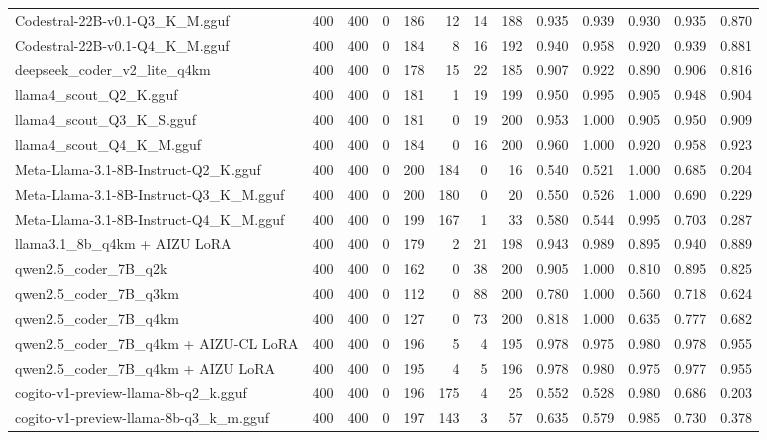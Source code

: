 \begin{table}[htbp]
{\begin{tabular}{lrrrrrrrrrrrr}
    Codestral-22B-v0.1-Q3\_K\_M.gguf & 400 & 400 & 0 & 186 & 12 & 14 & 188 & 0.935 & 0.939 & 0.930 & 0.935 & 0.870 \\
    Codestral-22B-v0.1-Q4\_K\_M.gguf & 400 & 400 & 0 & 184 & 8 & 16 & 192 & 0.940 & 0.958 & 0.920 & 0.939 & 0.881 \\
    deepseek\_coder\_v2\_lite\_q4km & 400 & 400 & 0 & 178 & 15 & 22 & 185 & 0.907 & 0.922 & 0.890 & 0.906 & 0.816 \\
    llama4\_scout\_Q2\_K.gguf & 400 & 400 & 0 & 181 & 1 & 19 & 199 & 0.950 & 0.995 & 0.905 & 0.948 & 0.904 \\
    llama4\_scout\_Q3\_K\_S.gguf & 400 & 400 & 0 & 181 & 0 & 19 & 200 & 0.953 & 1.000 & 0.905 & 0.950 & \cellcolor{green!10}0.909 \\
    llama4\_scout\_Q4\_K\_M.gguf & 400 & 400 & 0 & 184 & 0 & 16 & 200 & 0.960 & 1.000 & 0.920 & 0.958 & \cellcolor{green!30}0.923 \\
    Meta-Llama-3.1-8B-Instruct-Q2\_K.gguf & 400 & 400 & 0 & 200 & 184 & 0 & 16 & 0.540 & 0.521 & 1.000 & 0.685 & 0.204 \\
    Meta-Llama-3.1-8B-Instruct-Q3\_K\_M.gguf & 400 & 400 & 0 & 200 & 180 & 0 & 20 & 0.550 & 0.526 & 1.000 & 0.690 & 0.229 \\
    Meta-Llama-3.1-8B-Instruct-Q4\_K\_M.gguf & 400 & 400 & 0 & 199 & 167 & 1 & 33 & 0.580 & 0.544 & 0.995 & 0.703 & 0.287 \\
    llama3.1\_8b\_q4km + AIZU LoRA & 400 & 400 & 0 & 179 & 2 & 21 & 198 & 0.943 & 0.989 & 0.895 & 0.940 & 0.889 \\
    qwen2.5\_coder\_7B\_q2k & 400 & 400 & 0 & 162 & 0 & 38 & 200 & 0.905 & 1.000 & 0.810 & 0.895 & 0.825 \\
    qwen2.5\_coder\_7B\_q3km & 400 & 400 & 0 & 112 & 0 & 88 & 200 & 0.780 & 1.000 & 0.560 & 0.718 & 0.624 \\
    qwen2.5\_coder\_7B\_q4km & 400 & 400 & 0 & 127 & 0 & 73 & 200 & 0.818 & 1.000 & 0.635 & 0.777 & 0.682 \\
    qwen2.5\_coder\_7B\_q4km + AIZU-CL LoRA & 400 & 400 & 0 & 196 & 5 & 4 & 195 & 0.978 & 0.975 & 0.980 & 0.978 & \cellcolor{green!50}0.955 \\
    qwen2.5\_coder\_7B\_q4km + AIZU LoRA & 400 & 400 & 0 & 195 & 4 & 5 & 196 & 0.978 & 0.980 & 0.975 & 0.977 & \cellcolor{green!40}0.955 \\
    cogito-v1-preview-llama-8b-q2\_k.gguf & 400 & 400 & 0 & 196 & 175 & 4 & 25 & 0.552 & 0.528 & 0.980 & 0.686 & 0.203 \\
    cogito-v1-preview-llama-8b-q3\_k\_m.gguf & 400 & 400 & 0 & 197 & 143 & 3 & 57 & 0.635 & 0.579 & 0.985 & 0.730 & 0.378 \\

\end{tabular}}
\end{table}
